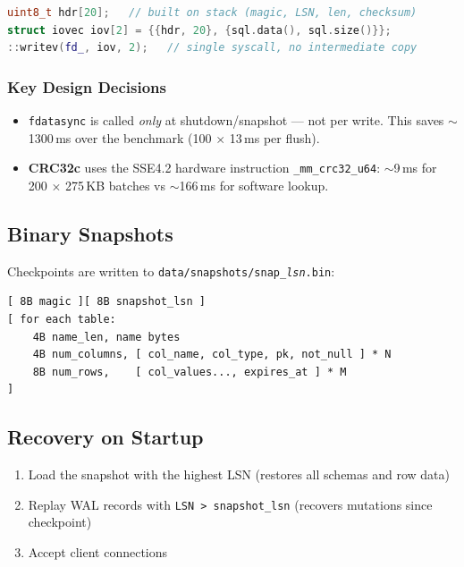 \documentclass[12pt,a4paper]{article}
\begin{document}
\begin{lstlisting}[language=C++]
uint8_t hdr[20];   // built on stack (magic, LSN, len, checksum)
struct iovec iov[2] = {{hdr, 20}, {sql.data(), sql.size()}};
::writev(fd_, iov, 2);   // single syscall, no intermediate copy
\end{lstlisting}

\subsubsection*{Key Design Decisions}

\begin{itemize}[noitemsep]
  \item \texttt{fdatasync} is called \textit{only} at shutdown/snapshot — not per write.
        This saves $\sim$1300\,ms over the benchmark (100 $\times$ 13\,ms per flush).
  \item \textbf{CRC32c} uses the SSE4.2 hardware instruction \texttt{\_mm\_crc32\_u64}:
        $\sim$9\,ms for 200 $\times$ 275\,KB batches vs $\sim$166\,ms for software lookup.
\end{itemize}

\subsection{Binary Snapshots}

Checkpoints are written to \texttt{data/snapshots/snap\_\textit{lsn}.bin}:

\begin{lstlisting}[language={}]
[ 8B magic ][ 8B snapshot_lsn ]
[ for each table:
    4B name_len, name bytes
    4B num_columns, [ col_name, col_type, pk, not_null ] * N
    8B num_rows,    [ col_values..., expires_at ] * M
]
\end{lstlisting}

\subsection{Recovery on Startup}

\begin{enumerate}[noitemsep]
  \item Load the snapshot with the highest LSN (restores all schemas and row data)
  \item Replay WAL records with \texttt{LSN > snapshot\_lsn} (recovers mutations since checkpoint)
  \item Accept client connections
\end{enumerate}
\end{document}
